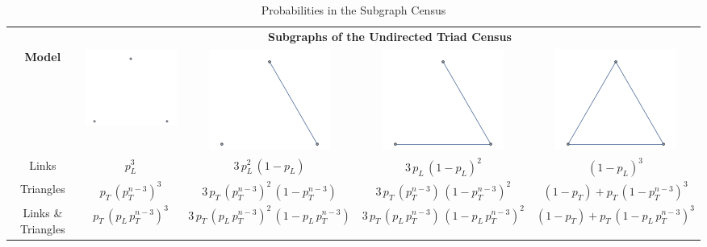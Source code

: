 \documentclass[conference]{IEEEtran}
\begin{document}
\begin{table}[b]
\def\arraystretch{1.5}
\caption{Probabilities in the Subgraph Census}
\begin{center}
\begin{tabular}{|c|c|c|c|c|}
\hline
\textbf{}&\multicolumn{4}{|c|}{\textbf{Subgraphs of the Undirected Triad Census}} \\
\cline{2-5}
\textbf{Model}&\includegraphics[scale=0.8]{Figure03_1.pdf}&\includegraphics[scale=.8]{Figure03_2.pdf}&\includegraphics[scale=.8]{Figure03_3.pdf}&\includegraphics[scale=.8]{Figure03_4.pdf}\\
\hline
Links & $p_{L}^{3}$ & $3 \, p_{L}^{2} \, (1-p_{L})$ & $3 \, p_{L} \, (1-p_{L})^{2}$ & $(1-p_{L})^{3}$ \\
\hline
Triangles & $p_{T} \, (p_{T}^{n - 3})^{3}$ & $3 \, p_{T} \, (p_{T}^{n - 3})^{2} \, (1 - p_{T}^{n - 3})$ & $3 \, p_{T} \, (p_{T}^{n - 3}) \, (1-p_{T}^{n - 3})^{2}$ & $(1 - p_{T}) + p_{T} \, (1 - p_{T}^{n - 3})^{3}$ \\
\hline
Links \& Triangles & $p_{T} \, (p_{L} \, p_{T}^{n - 3})^{3}$ & $3 \, p_{T} \, (p_{L} \, p_{T}^{n - 3})^{2} \, (1 - p_{L} \, p_{T}^{n - 3})$ & $3 \, p_{T} \, (p_{L} \, p_{T}^{n - 3}) \, (1 - p_{L} \, p_{T}^{n - 3})^{2}$ & $(1 - p_{T}) + p_{T} \, (1 - p_{L} \, p_{T}^{n - 3})^{3}$ \\
\hline
\end{tabular}
\label{tab:Table1}
\end{center}
\end{table}
\end{document}
